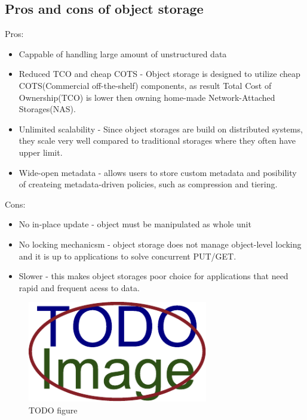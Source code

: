     \subsection{Pros and cons of object storage}
    Pros:
    \begin{itemize}
        \item{Cappable of handling large amount of unstructured data}
        \item{Reduced TCO and cheap COTS - Object storage is designed to utilize cheap COTS(Commercial off-the-shelf) components, as result Total Cost of Ownership(TCO) is lower then owning home-made Network-Attached Storages(NAS)\cite{networkStorage}.}
        \item{Unlimited scalability - Since object storages are build on distributed systems, they scale very well compared to traditional storages where they often have upper limit.\cite{openstackObjectStorage}}
        \item{Wide-open metadata - allows users to store custom metadata and posibility of createing metadata-driven policies, such as compression and tiering.}
    \end{itemize}
    Cons:
    \begin{itemize}
        \item{No in-place update - object must be manipulated as whole unit}
        \item{No locking mechanicsm - object storage does not manage object-level locking and it is up to applications to solve concurrent PUT/GET.}
        \item{Slower - this makes object storages poor choice for applications that need rapid and frequent acess to data.}
    \end{itemize}

    \begin{figure}[hbt]
        \centering
        \includegraphics[width=0.7\textwidth]{obrazky-figures/placeholder.pdf}
        \caption{TODO figure}
    \end{figure}


